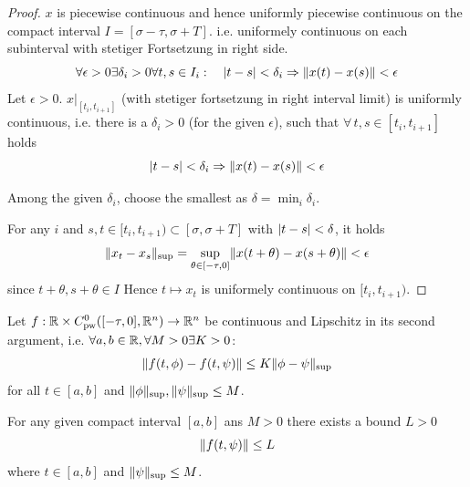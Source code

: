 \documentclass[10pt]{article}
\begin{document}
\begin{proof}
    $x$ is piecewise continuous and hence uniformly piecewise continuous on the compact interval $I=[\sigma-\tau,\sigma+T]$.
    i.e. uniformely continuous on each subinterval with stetiger Fortsetzung in right side.
    \begin{equation}
        \forall\epsilon >0 \exists\delta_i >0 \forall t,s\in I_i: \quad \lvert t-s\rvert<\delta_i \Rightarrow \lVert x(t)-x(s)\rVert<\epsilon
    \end{equation}
    Let $\epsilon > 0$. $x|_{[t_i,t_{i+1}]}$ (with stetiger fortsetzung in right interval limit) is uniformly continuous, i.e. there is a $\delta_i > 0$ (for the given $\epsilon$), such that $\forall\,t, s \in [t_i,t_{i+1}]$ holds
    \begin{equation}
        \lvert t-s\rvert < \delta_i \Rightarrow \lVert x(t)-x(s)\rVert < \epsilon
    \end{equation}

    Among the given $\delta_i$, choose the smallest as $\delta = \min_i \delta_i$.

    For any $i$ and $s,t\in [t_i,t_{i+1})\subset [\sigma,\sigma+T]$ with $\lvert t-s\rvert<\delta$, it holds
    \begin{equation}
        \lVert x_t - x_s\rVert_{\text{\scriptsize{sup}}} = \sup_{\theta\in [-\tau,0]}\lVert x(t+\theta) - x(s+\theta)\rVert < \epsilon
    \end{equation}
    since $t+\theta, s+\theta \in I$
    Hence $t \mapsto x_t$ is uniformely continuous on $[t_i,t_{i+1})$.


\end{proof}

\begin{lemma}
    \label{lemma-bounded-f}

    Let $f:\mathbb{R}\times C^0_\text{pw}([-\tau,0],\mathbb{R}^n)\rightarrow\mathbb{R}^n$ be continuous and Lipschitz in its second argument, i.e. $\forall a,b\in\mathbb{R},\forall M>0 \exists K>0$:
    \begin{equation}
        \lVert f(t,\phi) - f(t,\psi)\rVert \leq K\lVert\phi - \psi\rVert_{\text{\scriptsize{sup}}}
    \end{equation}
    for all $t\in [a,b]$ and $\lVert\phi\rVert_{\text{\scriptsize{sup}}},\lVert\psi\rVert_{\text{\scriptsize{sup}}}\leq M$.

    For any given compact interval $[a,b]$ ans $M>0$ there exists a bound $L>0$
    \begin{equation}
        \lVert f(t,\psi)\rVert\leq L
    \end{equation}
    where $t\in[a,b]$ and $\lVert\psi\rVert_{\text{\scriptsize{sup}}}\leq M$.
\end{lemma}
\end{document}

